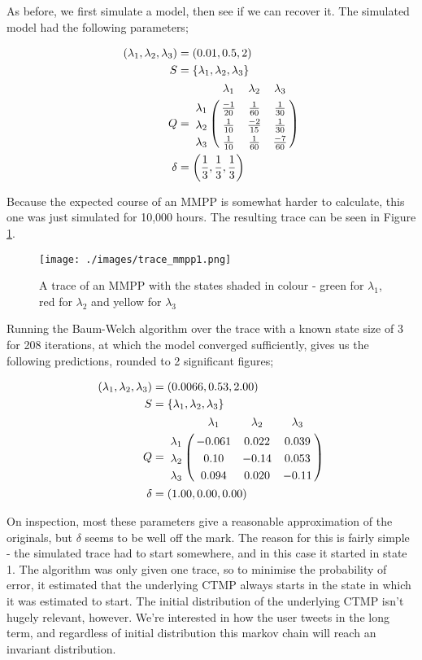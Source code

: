 As before, we first simulate a model, then see if we can recover it. The simulated model had the following parameters;

\begin{align*}
(\lambda_1,\lambda_2,\lambda_3) &= (0.01,0.5,2)\\
S &= \{\lambda_1,\lambda_2,\lambda_3\}\\
Q &= \bordermatrix{      & \lambda_1 & \lambda_2 & \lambda_3\cr
                \lambda_1 & \frac{-1}{20} & \frac{1}{60}  & \frac{1}{30} \cr
                \lambda_2 & \frac{1}{10}  & \frac{-2}{15} & \frac{1}{30} \cr
                \lambda_3 & \frac{1}{10}  & \frac{1}{60}  & \frac{-7}{60}\cr
			}\\
\delta &= \left(\frac{1}{3},\frac{1}{3},\frac{1}{3}\right)
\end{align*}

Because the expected course of an MMPP is somewhat harder to calculate, this one was just simulated for 10,000 hours. The resulting trace can be seen in Figure \ref{trace_mmpp1}.

\begin{figure}[h!]
\texttt{[image: ./images/trace\_mmpp1.png]}
\caption{A trace of an MMPP with the states shaded in colour - green for $\lambda_1$, red for $\lambda_2$ and yellow for $\lambda_3$}
\label{trace_mmpp1}
\end{figure}

Running the Baum-Welch algorithm over the trace with a known state size of 3 for 208 iterations, at which the model converged sufficiently, gives us the following predictions, rounded to 2 significant figures;

\begin{align*}
(\lambda_1,\lambda_2,\lambda_3) &= (0.0066,0.53,2.00)\\
S &= \{\lambda_1,\lambda_2,\lambda_3\}\\
Q &= \bordermatrix{      & \lambda_1 & \lambda_2 & \lambda_3\cr
                \lambda_1 & -0.061 & 0.022 & 0.039 \cr
                \lambda_2 & 0.10 & -0.14 & 0.053 \cr
                \lambda_3 & 0.094 & 0.020 & -0.11 \cr
			}\\
\delta &= (1.00,0.00,0.00)
\end{align*}

On inspection, most these parameters give a reasonable approximation of the originals, but $\delta$ seems to be well off the mark. The reason for this is fairly simple - the simulated trace had to start somewhere, and in this case it started in state 1. The algorithm was only given one trace, so to minimise the probability of error, it estimated that the underlying CTMP always starts in the state in which it was estimated to start. The initial distribution of the underlying CTMP isn't hugely relevant, however. We're interested in how the user tweets in the long term, and regardless of initial distribution this markov chain will reach an invariant distribution.

